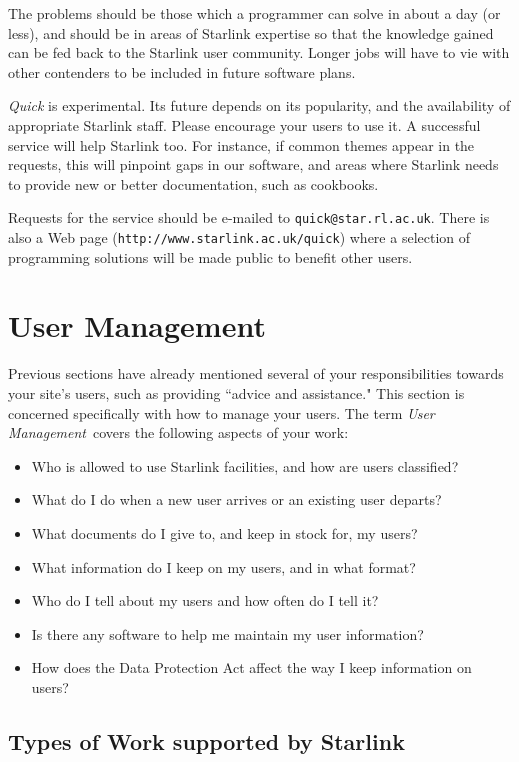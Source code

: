 \documentclass[twoside,11pt]{article}
\begin{document}
The problems should be those which a programmer can solve in about
a day (or less), and should be in areas of Starlink expertise so that the
knowledge gained can be fed back to the Starlink user community.
Longer jobs will have to vie with other contenders to be included in future
software plans.

{\em Quick}\/ is experimental.
Its future depends on its popularity, and the availability of appropriate
Starlink staff. 
Please encourage your users to use it.
A successful service will help Starlink too.
For instance, if common themes appear in the requests, this will pinpoint
gaps in our software, and areas where Starlink needs to provide new or better
documentation, such as cookbooks.

Requests for the service should be e-mailed to {\tt quick@star.rl.ac.uk}.
There is also a Web page ({\tt http://www.starlink.ac.uk/quick}) where a
selection of programming solutions will be made public to benefit
other users.

\newpage

\section {\label{usermanagement}User Management}

Previous sections have already mentioned several of your responsibilities
towards your site's users, such as providing ``advice and assistance."
This section is concerned specifically with how to manage your users.
The term {\em User Management}\, covers the following aspects of your work:
\begin{itemize}
\item Who is allowed to use Starlink facilities, and how are users
      classified?
\item What do I do when a new user arrives or an existing user departs?
\item What documents do I give to, and keep in stock for, my users?
\item What information do I keep on my users, and in what format?
\item Who do I tell about my users and how often do I tell it?
\item Is there any software to help me maintain my user information?
\item How does the Data Protection Act affect the way I keep information on
      users?
\end{itemize}

\subsection{\label{worktype}Types of Work supported by Starlink}
\end{document}
